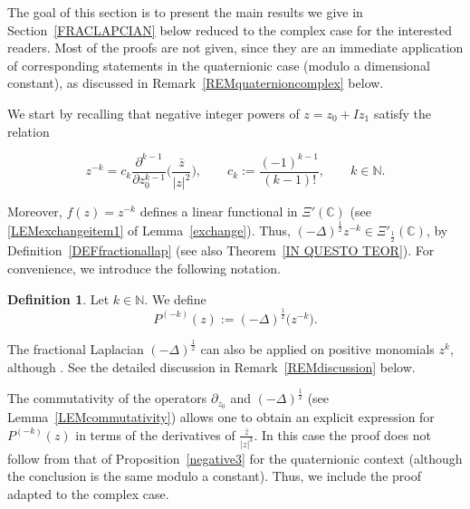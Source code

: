 \documentclass[reqno,11pt]{amsart}
\theoremstyle{definition}
\newtheorem{definition}[theorem]{Definition}
\begin{document}
The goal of this section is to present the main results we give in Section~\ref{FRACLAPCIAN} below reduced to the complex case for the interested readers. Most of the proofs are not given, since they are an immediate application of corresponding statements in the quaternionic case (modulo a dimensional constant), as discussed in Remark~\ref{REMquaternioncomplex} below.


We start by recalling that negative integer powers of $z=z_0+Iz_1$ satisfy the relation

\begin{equation}
	\label{negativecomplexz}
	z^{-k}= c_k \frac{\partial^{k-1}}{\partial z_0^{k-1}} \bigg( \frac{\bar{z}}{|z|^2}\bigg), \qquad c_k := \frac{(-1)^{k-1}}{(k-1)!}, \qquad k\in \mathbb{N}.
\end{equation}

Moreover, $f(z)=z^{-k}$ defines a linear functional in $\Xi'(\mathbb{C})$ (see \ref{LEMexchangeitem1} of Lemma~\ref{exchange}). Thus, $(-\Delta)^{\frac{1}{2}} z^{-k}\in \Xi'_{\frac{1}{2}}(\mathbb{C})$, by Definition~\ref{DEFfractionallap} (see also Theorem~\ref{IN QUESTO TEOR}). For convenience, we introduce the following notation.

\begin{definition}
	Let $k\in\mathbb{N}$. We define
	\[
	P^{(-k)}(z) := (-\Delta)^\frac{1}{2}\big(z^{-k}\big).
	\]
\end{definition}
The fractional Laplacian $(-\Delta)^\frac{1}{2}$ can also be applied on positive monomials $z^k$, although . See the detailed discussion in Remark~\ref{REMdiscussion} below.


The commutativity of the operators $\partial_{z_0}$ and $ (-\Delta)^{\frac{1}{2}}$ (see Lemma~\ref{LEMcommutativity}) allows one to obtain an explicit expression for $P^{(-k)}(z)$ in terms of the derivatives of $\frac{\bar{z}}{|z|^3}$. In this case the proof does not follow from that of Proposition~\ref{negative3} for the quaternionic context (although the conclusion is the same modulo a constant). Thus, we include the proof adapted to the complex case.
\end{document}
